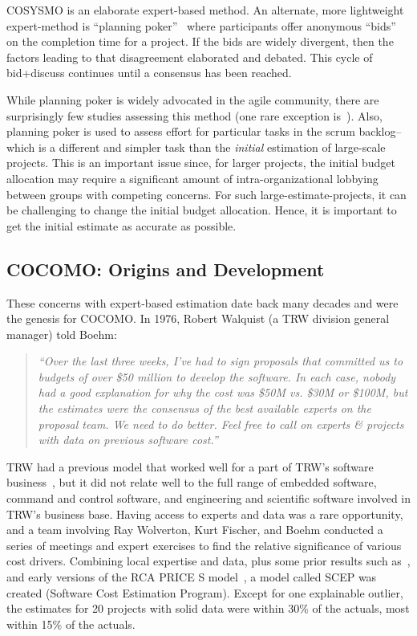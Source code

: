 \documentclass[smallcondesed]{svjour3}
\begin{document}
COSYSMO is an elaborate expert-based method. An alternate, more lightweight expert-method is  ``planning poker''~\cite{molokk08} where
participants offer anonymous
``bids'' on the 
completion time for a project. If  the bids are widely divergent, then the factors
leading to that disagreement elaborated and debated. This cycle of bid+discuss continues
until a consensus has been reached.

While planning poker is widely advocated in the agile community,
there are surprisingly few studies assessing this method (one rare exception is~\cite{molokk08}).
Also,   planning poker is used to assess effort
for particular tasks in the scrum backlog-- which is a different and simpler task
than the {\em initial} estimation of  large-scale
projects. This is an important issue since, for larger
projects, the initial budget allocation may require a significant amount of intra-organizational lobbying between groups with competing concerns. For such large-estimate-projects, it can
be challenging to change the initial budget allocation. Hence, it is important to get
the initial estimate as accurate as possible.

 

\subsection{COCOMO: Origins and Development}
These concerns with  expert-based estimation  date
back many decades and were the genesis for  COCOMO. In 1976, Robert Walquist (a TRW division general manager)
told  Boehm: \begin{quote}{\em ``Over the last three
weeks, I've had to sign proposals that committed us
to budgets of over \$50 million to develop the
software.  In each case, nobody had a good
explanation for why the cost was \$50M vs. \$30M or
\$100M, but the estimates were the consensus of the
best available experts on the proposal team.  We
need to do better. Feel free to call on experts
\& projects with data on previous software cost.''}\end{quote}



TRW had a previous model that worked well for a part
of TRW's software business~\cite{wol74}, but it
did not relate well to the full range of embedded
software, command and control software, and
engineering and scientific software involved in
TRW's business base.  Having access to experts and
data was a rare opportunity, and a team involving
Ray Wolverton, Kurt Fischer, and Boehm conducted a
series of meetings and expert exercises to find
the relative significance of various  cost
drivers. Combining local expertise  and data, plus some prior results 
such as~\cite{putnam76,black77,herd77,watson77},  and early versions of the RCA
PRICE S model~\cite{frei79}, a model called SCEP was created (Software Cost
Estimation Program).
Except for
one explainable outlier, the estimates for
 20 projects with solid data were within 30\% of
the actuals, most within 15\% of the actuals.
\end{document}
